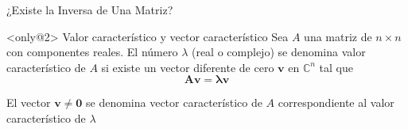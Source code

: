 \begin{frame}{¿Existe la Inversa de Una Matriz?}

\begin{block}<only@2>{ Valor característico y vector característico}\justifying
  Sea $A$ una matriz de $n \times n$ con componentes reales. El número $\lambda$ (real o complejo) se denomina \alert{valor característico} de $A$ si existe un vector diferente de cero $\bm{v}$ en $\mathbb{C}^n$ tal que \[\bm{Av} = \bm{\lambda v} \]

  El vector $\bm{v} \neq \bm{0}$ se denomina \alert{vector característico} de $A$ correspondiente al \alert{valor característico} de $\lambda$
\end{block}


\end{frame}
